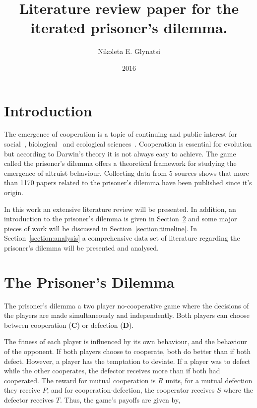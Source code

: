 \documentclass{article}
\title{Literature review paper for the iterated prisoner's dilemma.}
\author{Nikoleta E. Glynatsi}
\date{2016}
\begin{document}
\maketitle

\section{Introduction}\label{section:introduction}

The emergence of cooperation is a topic of continuing and public interest
for social~\cite{capraro2014, gracia2012},
biological~\cite{Douglas2011}
and ecological sciences~\cite{Godfray1992,Krama2012,Milinski1987,Wilkinson1984}.
Cooperation is essential for evolution but according to Darwin’s theory 
it is not always easy to achieve. The game called the prisoner's
dilemma offers a theoretical framework for studying the emergence of
altruist behaviour. Collecting data from 5 sources shows that more than 1170 papers
related to the prisoner's dilemma have been published since it's origin.

In this work an extensive literature review will be presented. In addition, 
an introduction to the prisoner's dilemma is given in Section~\ref{section:prisoners_dilemma}
and some major pieces of work will be discussed in Section~\ref{section:timeline}.
In Section~\ref{section:analysis} a comprehensive data set of literature
regarding the prisoner's dilemma will be presented and analysed.

\section{The Prisoner's Dilemma}\label{section:prisoners_dilemma}

The prisoner's dilemma a two player no-cooperative game where the decisions
of the players are made simultaneously and independently. Both players can
choose between cooperation (\textbf{C}) or defection (\textbf{D}).

The fitness of each player is influenced by its own behaviour, and the behaviour
of the opponent. If both players choose to cooperate, both do better
than if both defect. However, a player has the temptation to deviate. If a
player was to defect while the other cooperates, the defector receives
more than if both had cooperated. The reward for mutual cooperation is \(R\)
units, for a mutual defection they receive \(P\), and for cooperation-defection,
the cooperator receives \(S\) where the defector receives \(T\). Thus, the game's
payoffs are given by,
\end{document}
